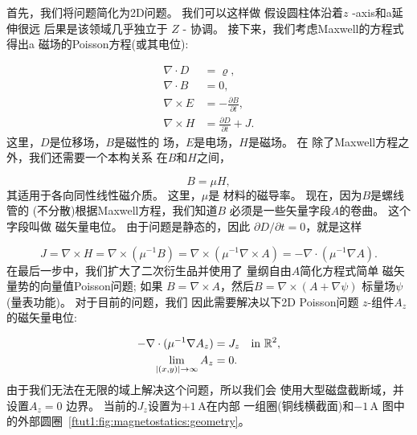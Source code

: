 
首先，我们将问题简化为2D问题。 我们可以这样做
假设圆柱体沿着$z$ -axis和a延伸很远
后果是该领域几乎独立于
$Z$ - 协调。 接下来，我们考虑Maxwell的方程式得出a
磁场的Poisson方程(或其电位):

\begin{align}
  \nabla\cdot  D &= \varrho, \\
  \nabla\cdot  B &= 0, \\
  \nabla\times E &= -\frac{\partial B}{\partial t}, \\
  \nabla\times H &= \frac{\partial D}{\partial t} + J.
\end{align}
这里，$D$是位移场，$B$是磁性的
场，$E$是电场，$H$是磁场。 在
除了Maxwell方程之外，我们还需要一个本构关系
在$B$和$H$之间，

\begin{equation}
  B = \mu H,
\end{equation}
其适用于各向同性线性磁介质。 这里，$\mu$是
材料的磁导率。 现在，因为$B$是螺线管的
(不分散)根据Maxwell方程，我们知道$B$
必须是一些矢量字段$A$的卷曲。 这个字段叫做
磁矢量电位。 由于问题是静态的，因此
$\partial D/\partial t = 0$，就是这样

\begin{equation}
  J = \nabla \times H
    = \nabla \times (\mu^{-1} B)
    = \nabla \times (\mu^{-1} \nabla \times A)
    = -\nabla \cdot (\mu^{-1} \nabla A).
\end{equation}
在最后一步中，我们扩大了二次衍生品并使用了
量纲自由$A$简化方程式简单
磁矢量势的向量值Poisson问题; 如果
$B = \nabla \times A$，然后$B = \nabla \times (A + \nabla \psi)$
标量场$\psi$(量表功能)。 对于目前的问题，我们
因此需要解决以下2D Poisson问题
$z$-组件$A_z$的磁矢量电位:

\begin{align}
  - \nabla \cdot (\mu^{-1} \nabla A_z) &= J_z \quad \text{in } \Real^2, \\
  \lim_{|(x, y)| \rightarrow \infty} A_z &= 0.
\end{align}
由于我们无法在无限的域上解决这个问题，所以我们会
使用大型磁盘截断域，并设置$A_z = 0$
边界。 当前的$J_z$设置为$+1\,\mathrm{A}$在内部
一组圈(铜线横截面)和$-1\,\mathrm{A}$
图中的外部圆圈~\ref{ftut1:fig:magnetostatics:geometry}。

